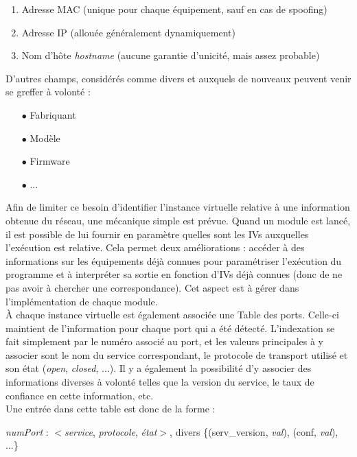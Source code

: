\documentclass[]{article}
\begin{document}
\begin{enumerate}
\item Adresse MAC (unique pour chaque équipement, sauf en cas de spoofing)
\item Adresse IP (allouée généralement dynamiquement)
\item Nom d'hôte \textit{hostname} (aucune garantie d'unicité, mais assez probable)
\end{enumerate}

\vspace{0.2cm}

D'autres champs, considérés comme divers et auxquels de nouveaux peuvent venir se greffer à volonté :

\begin{itemize}
\item[$\bullet$] Fabriquant
\item[$\bullet$] Modèle
\item[$\bullet$] Firmware
\item[$\bullet$] ...
\end{itemize}

\vspace{0.4cm}

Afin de limiter ce besoin d'identifier l'instance virtuelle relative à une information obtenue du réseau, une mécanique simple est prévue. Quand un module est lancé, il est possible de lui fournir en paramètre quelles sont les IVs auxquelles l'exécution est relative. Cela permet deux améliorations : accéder à des informations sur les équipements déjà connues pour paramétriser l'exécution du programme et à interpréter sa sortie en fonction d'IVs déjà connues (donc de ne pas avoir à chercher une correspondance). Cet aspect est à gérer dans l'implémentation de chaque module.\\  

À chaque instance virtuelle est également associée une Table des ports. Celle-ci maintient de l'information pour chaque port qui a été détecté. L'indexation se fait simplement par le numéro associé au port, et les valeurs principales à y associer sont le nom du service correspondant, le protocole de transport utilisé et son état (\textit{open}, \textit{closed}, ...). Il y a également la possibilité d'y associer des informations diverses à volonté telles que la version du service, le taux de confiance en cette information, etc.\\

\indent Une entrée dans cette table est donc de la forme :
\begin{center}
\textit{numPort} : $<$\textit{service}, \textit{protocole}, \textit{état}$>$, divers \{(serv\_version, \textit{val}), (conf, \textit{val}), ...\}
\end{center}
\end{document}
